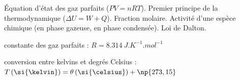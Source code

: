 \begin{prerequis}
	Équation d'état des gaz parfaits ($PV=nRT$). Premier principe de la thermodynamique ($\Delta U = W + Q$). 
	Fraction molaire.
	Activité d'une espèce chimique (en phase gazeuse, en phase condensée). 
	Loi de Dalton.
	
\constantesUtiles
	\begin{listeConstantes}
		\item constante des gaz parfaits : $R=\SI{8,314}{J.K^{-1}.mol^{-1}}$
		\item conversion entre kelvins et degrés Celsius : $T\,(\si{\kelvin}) = \theta\, (\si{\celsius}) + \np{273,15}$
	\end{listeConstantes}	
\end{prerequis}








\hauteurLargeurCadreReponse		{7mm}{3cm}
\initialisationEntrainement


\debutEntrainement

